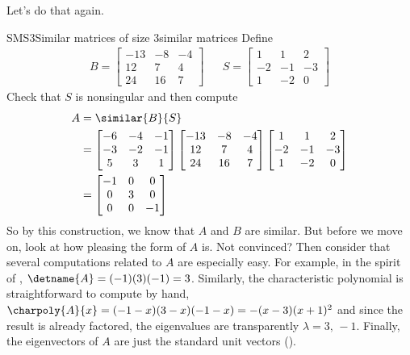 %
Let's do that again.
%
\begin{example}{SMS3}{Similar matrices of size 3}{similar matrices}
Define
\begin{align*}
B=\begin{bmatrix}
-13 & -8 & -4 \\
12 & 7 & 4 \\
24 & 16 & 7
\end{bmatrix}
&&
S=\begin{bmatrix}
1 & 1 & 2 \\
-2 & -1 & -3 \\
1 & -2 & 0
\end{bmatrix}
\end{align*}
%
Check that $S$ is nonsingular and then compute
%
\begin{align*}
A&=\similar{B}{S}\\
&=
\begin{bmatrix}
-6 & -4 & -1 \\
-3 & -2 & -1 \\
5 & 3 & 1
\end{bmatrix}
\begin{bmatrix}
-13 & -8 & -4 \\
12 & 7 & 4 \\
24 & 16 & 7
\end{bmatrix}
\begin{bmatrix}
1 & 1 & 2 \\
-2 & -1 & -3 \\
1 & -2 & 0
\end{bmatrix}\\
&=
\begin{bmatrix}
-1 & 0 & 0 \\
0 & 3 & 0 \\
0 & 0 & -1
\end{bmatrix}
%
\end{align*}
%
So by this construction, we know that $A$ and $B$ are similar.  But before we move on, look at how pleasing the form of $A$ is.  Not convinced?  Then consider that several computations related to $A$ are especially easy.  For example, in the spirit of , $\detname{A}=(-1)(3)(-1)=3$.  Similarly, the characteristic polynomial is straightforward to compute by hand, $\charpoly{A}{x}=(-1-x)(3-x)(-1-x)=-(x-3)(x+1)^2$ and since the result is already factored, the eigenvalues are transparently $\lambda=3,\,-1$.  Finally, the eigenvectors of $A$ are just the standard unit vectors ().
%
\end{example}
